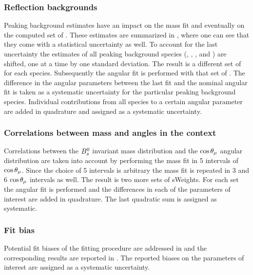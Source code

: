 \subsubsection{Reflection backgrounds}
\label{systPeakBkg}
Peaking background estimates have an impact on the mass fit and eventually on the computed set of \sWeights.
These estimates are summarized in , where one can see that they come with a statistical uncertainty as well.
To account for the last uncertainty  the estimates of all peaking background species (\BsJpsiKK, \BsJpsipipi, \BdJpsipipi, and \LbJpsipK)
are shifted, one at a time by one standard deviation. The result is a different set of \sWeights for each species.
Subsequently the angular fit is performed with that set of \sWeights. The difference in the angular parameters
between the last fit and the nominal angular fit is taken as a systematic uncertainty for the particular peaking
background species. Individual contributions from all species to a certain angular parameter are added in quadrature
and assigned as a systematic uncertainty.

\subsubsection{Correlations between mass and angles in the \sPlot context}
\label{systCorrs}
Correlations between the $B^0_s$ invariant mass distribution and the $\cos\theta_{\mu}$ angular distribution are taken into account
by performing the mass fit in 5 intervals of $\cos\theta_{\mu}$. Since the choice of 5 intervals is arbitrary the mass fit is
repeated in 3 and 6 $\cos\theta_{\mu}$ intervals as well. The result is two more sets of sWeights. For each set the angular
fit is performed and the differences in each of the parameters of interest are added in quadrature. The last quadratic
sum is assigned as systematic.

\subsubsection{Fit bias}
\label{systFitBias}
Potential fit biases of the fitting procedure are addressed in  and the corresponding
results are reported in . The reported biases on the parameters of interest are assigned as a systematic uncertainty.

